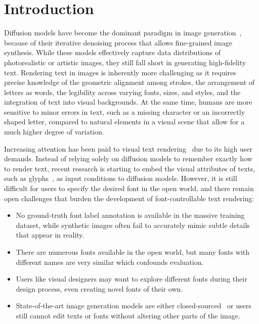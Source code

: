 \section{Introduction}
Diffusion models have become the dominant paradigm in image generation~\cite{ho2020denoising, saharia2022photorealistic, zhang2023adding, rombach2022high, betker2023improving, ramesh2022hierarchical, esser2024scaling}, because of their iterative denoising process that allows fine-grained image synthesis. While these models effectively capture data distributions of photorealistic or artistic images, they still fall short in generating high-fidelity text. Rendering text in images is inherently more challenging as it requires precise knowledge of the geometric alignment among strokes, the arrangement of letters as words, the legibility across varying fonts, sizes, and styles, and the integration of text into visual backgrounds. At the same time, humans are more sensitive to minor errors in text, such as a missing character or an incorrectly shaped letter, compared to natural elements in a visual scene that allow for a much higher degree of variation.

Increasing attention has been paid to visual text rendering~\cite{bai2024intelligent, han2024ace, li2024hfh} due to its high user demands. Instead of relying solely on diffusion models to remember exactly how to render text, recent research is starting to embed the visual attributes of texts, such as glyphs~\cite{tuo2023anytext, liu2024glyph, ma2024glyphdraw2, yang2024glyphcontrol}, as input conditions to diffusion models. However, it is still difficult for users to specify the desired font in the open world, and there remain open challenges that burden the development of font-controllable text rendering:
\begin{itemize}
\item No ground-truth font label annotation is available in the massive training dataset, while synthetic images often fail to accurately mimic subtle details that appear in reality.
\item There are numerous fonts available in the open world, but many fonts with different names are very similar which confounds evaluation.
\item Users like visual designers may want to explore different fonts during their design process, even creating novel fonts of their own. 
\item State-of-the-art image generation models are either closed-sourced~\cite{betker2023improving, midjourney} or users still cannot edit texts or fonts without altering other parts of the image.
\end{itemize}

